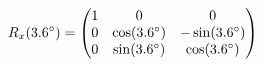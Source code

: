 \documentclass[preview]{standalone}
\begin{document}
\begin{align*}
\special{dvisvgm:raw <g id='unique000'>}R_x(3.6^\circ) = \begin{pmatrix} 1 & 0 & 0 \\ 0 & \cos(3.6^\circ) & -\sin(3.6^\circ) \\ 0 & \sin(3.6^\circ) & \cos(3.6^\circ) \end{pmatrix}\special{dvisvgm:raw </g>}
\end{align*}
\end{document}
